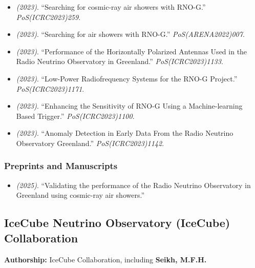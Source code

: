 \begin{itemize}
\item \textit{(2023)}. ``Searching for cosmic-ray air showers with RNO-G.'' \textit{PoS(ICRC2023)259}. 
\item \textit{(2023)}. ``Searching for air showers with RNO-G.'' \textit{PoS(ARENA2022)007}. 
\item \textit{(2023)}. ``Performance of the Horizontally Polarized Antennas Used in the Radio Neutrino Observatory in Greenland.'' \textit{PoS(ICRC2023)1133}. 
\item \textit{(2023)}. ``Low-Power Radiofrequency Systems for the RNO-G Project.'' \textit{PoS(ICRC2023)1171}. 
\item \textit{(2023)}. ``Enhancing the Sensitivity of RNO-G Using a Machine-learning Based Trigger.'' \textit{PoS(ICRC2023)1100}. 
\item \textit{(2023)}. ``Anomaly Detection in Early Data From the Radio Neutrino Observatory Greenland.'' \textit{PoS(ICRC2023)1142}. 
\end{itemize}
\subsubsection{Preprints and Manuscripts}
\begin{itemize}
\item \textit{(2025)}. ``Validating the performance of the Radio Neutrino Observatory in Greenland using cosmic-ray air showers.'' 
\end{itemize}
\medskip

\subsection{IceCube Neutrino Observatory (IceCube) Collaboration}
\textbf{Authorship:} IceCube Collaboration, including \textbf{Seikh, M.F.H.}
